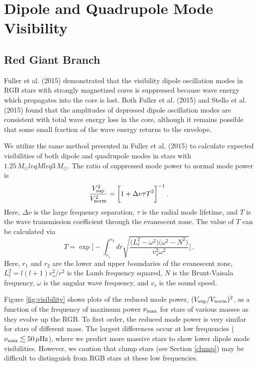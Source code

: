 \section{Dipole and Quadrupole Mode Visibility}


\subsection{Red Giant Branch}
\label{rgb}

Fuller et al. (2015) demonstrated that the visibility dipole oscillation modes in RGB stars with strongly magnetized cores is suppressed because wave energy which propagates into the core is lost. Both Fuller et al. (2015) and Stello et al. (2015) found that the amplitudes of depressed dipole oscillation modes are consistent with total wave energy loss in the core, although it remains possible that some small fraction of the wave energy returns to the envelope.

We utilize the same method presented in Fuller et al. (2015) to calculate expected visibilities of both dipole and quadrupole modes in stars with $1.25 \, M_\odot leq M leq 3 \, M_\odot$. The ratio of suppressed mode power to normal mode power is
\begin{equation}
\label{eqn:vsup}
\frac{V_{\rm sup}^2}{V_{\rm norm}^2} = \bigg[ 1 + \Delta \nu \tau T^2 \bigg]^{-1} \, .
\end{equation}
Here, $\Delta \nu$ is the large frequency separation, $\tau$ is the radial mode lifetime, and $T$ is the wave transmission coefficient through the evanescent zone. The value of $T$ can be calculated via
\begin{equation}
\label{eqn:T}
T  = \exp \bigg[ - \int^{r_2}_{r_1} dr \sqrt{ \frac{ \big( L_\ell^2 - \omega^2 \big) \big( \omega^2 - N^2 \big) }{v_s^2 \omega^2} } \bigg] \, .
\end{equation}
Here, $r_1$ and $r_2$ are the lower and upper boundaries of the evanescent zone, $L_\ell^2 = l(l+1)v_s^2/r^2$ is the Lamb frequency squared, $N$ is the Brunt-Vaisala frequency, $\omega$ is the angular wave frequency, and $v_s$ is the sound speed.
  
Figure \ref{fig:visibility} shows plots of the reduced mode power, $(V_{\rm sup}/V_{\rm norm})^2$, as a function of the frequency of maximum power $\nu_{\rm max}$ for stars of various masses as they evolve up the RGB. To first order, the reduced mode power is very similar for stars of different mass. The largest differences occur at low frequencies ($\nu_{\rm max} \lesssim 50 \, \mu {\rm Hz}$), where we predict more massive stars to show lower dipole mode visibilities. However, we caution that clump stars (see Section \ref{clump}) may be difficult to distinguish from RGB stars at these low frequencies.


